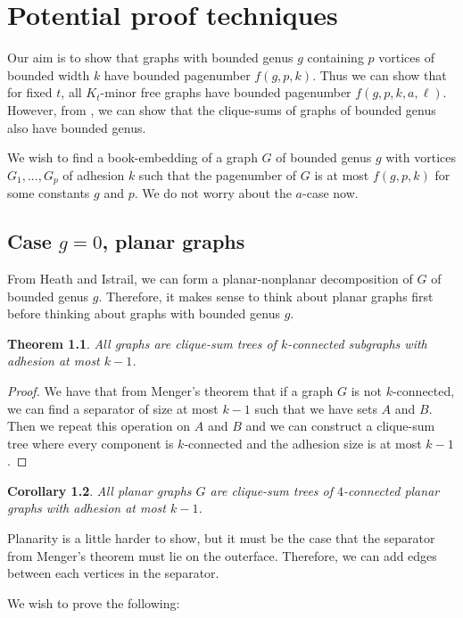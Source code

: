 \documentclass[]{report}
\newtheorem{theorem}{Theorem}
\newtheorem{corollary}[theorem]{Corollary}
\theoremstyle{definition}
\numberwithin{theorem}{section}
\numberwithin{equation}{section}
\begin{document}
\chapter{Potential proof techniques}\label{chap:Proving_The_Theorem}
Our aim is to show that graphs with bounded genus $g$ containing $p$ vortices of bounded width $k$ have bounded pagenumber $f(g, p, k)$. Thus we can show that for fixed $t$, all $K_t$-minor free graphs have bounded pagenumber $f(g, p, k, a, \ell)$. However, from \cite{hickingbothamStackNumberCliqueSum2023}, we can show that the clique-sums of graphs of bounded genus also have bounded genus.

We wish to find a book-embedding of a graph $G$ of bounded genus $g$ with vortices $G_1, ..., G_p$ of adhesion $k$ such that the pagenumber of $G$ is at most $f(g, p, k)$ for some constants $g$ and $p$. We do not worry about the $a$-case now.

\section{Case $g = 0$, planar graphs}
From Heath and Istrail, we can form a planar-nonplanar decomposition of $G$ of bounded genus $g$. Therefore, it makes sense to think about planar graphs first before thinking about graphs with bounded genus $g$.
\begin{theorem}\label{thm:clique_sum_connected}
	All graphs are clique-sum trees of $k$-connected subgraphs with adhesion at most $k-1$.
\end{theorem}
\begin{proof}
	We have that from Menger's theorem that if a graph $G$ is not $k$-connected, we can find a separator of size at most $k-1$ such that we have sets $A$ and $B$. Then we repeat this operation on $A$ and $B$ and we can construct a clique-sum tree where every component is $k$-connected and the adhesion size is at most $k-1$. 
\end{proof}

\begin{corollary}\label{corr:planar_graphs_4_connected_cliqesums}
	All planar graphs $G$ are clique-sum trees of $4$-connected planar graphs with adhesion at most $k-1$.
\end{corollary}
Planarity is a little harder to show, but it must be the case that the separator from Menger's theorem must lie on the outerface. Therefore, we can add edges between each vertices in the separator. 

We wish to prove the following:
\end{document}
